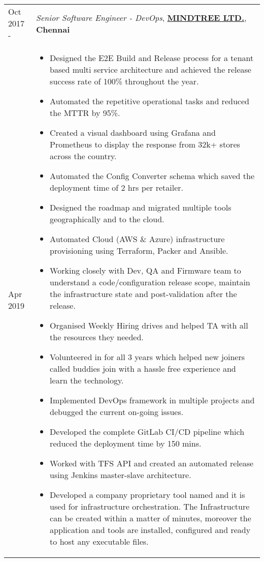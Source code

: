\documentclass[11pt, a4paper]{article}
\begin{document}
\noindent\begin{tabular}{L{1.7cm}!{\color{gray}\vrule}l}
Oct 2017 -  & \textit{Senior Software Engineer - DevOps}, \textcolor{NavyBlue}{\textbf{\href{https://www.mindtree.com/about}{MINDTREE LTD.}}},  \textbf{Chennai} \\
Apr 2019 &
  \begin{minipage}[t]{0.86\textwidth}
    \begin{itemize}[leftmargin=*]
    \itemsep-0.1em 
    \vspace{0mm}
    \item Designed the E2E Build and Release process for a tenant based multi service architecture and achieved the release success rate of 100\% throughout the year.
    \item Automated the repetitive operational tasks and reduced the MTTR by 95\%.
    \item Created a visual dashboard using Grafana and Prometheus to display the response from 32k+ stores across the country.
    \item Automated the Config Converter schema which saved the deployment time of 2 hrs per retailer.
    \item Designed the roadmap and migrated multiple tools geographically and to the cloud.
    \item Automated Cloud (AWS \& Azure) infrastructure provisioning using Terraform, Packer and Ansible.
    \item Working closely with Dev, QA and Firmware team to understand a code/configuration release scope,
maintain the infrastructure state and post-validation after the release.
    \item Organised Weekly Hiring drives and helped TA with all the resources they needed.
    \item Volunteered in  for all 3 years which helped new joiners called buddies join with a hassle free experience and learn the technology.
    \item Implemented DevOps framework in multiple projects and debugged the current on-going issues.
    \item Developed the complete GitLab CI/CD pipeline which reduced the deployment time by 150 mins.
    \item Worked with TFS API and created an automated release using Jenkins master-slave architecture.
    \item Developed a company proprietary tool named  and it is used for infrastructure orchestration. The Infrastructure can be created within a matter of minutes, moreover the application and tools are installed, configured and ready to host any executable files.

\end{itemize}
\end{minipage}
\end{tabular}
\end{document}
